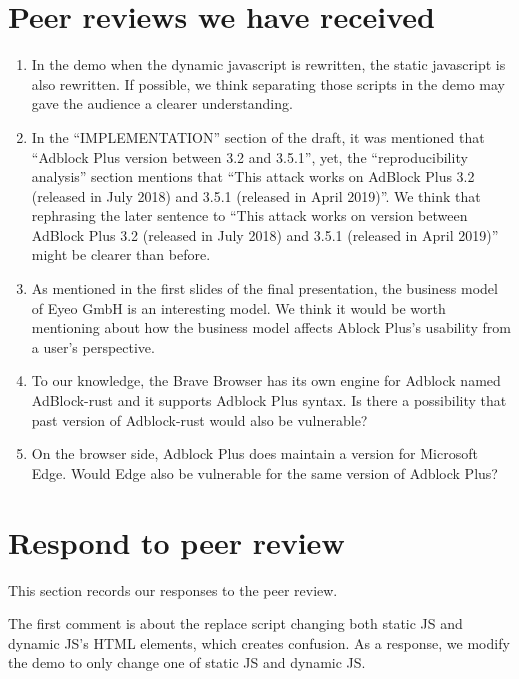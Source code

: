 \documentclass[conference]{IEEEtran}
\begin{document}
\begin{appendices}

\section{Peer reviews we have received}

\begin{enumerate}
    \item In the demo when the dynamic javascript is rewritten, the static javascript is also rewritten. If possible, we think separating those scripts in the demo may gave the audience a clearer understanding.
    \item In the ``IMPLEMENTATION'' section of the draft, it was mentioned that ``Adblock Plus version between 3.2 and 3.5.1'', yet, the ``reproducibility analysis'' section mentions that ``This attack works on AdBlock Plus 3.2 (released in July 2018) and 3.5.1 (released in April 2019)''. We think that rephrasing the later sentence to ``This attack works on version between AdBlock Plus 3.2 (released in July 2018) and 3.5.1 (released in April 2019)'' might be clearer than before.
    \item As mentioned in the first slides of the final presentation, the business model of Eyeo GmbH is an interesting model. We think it would be worth mentioning about how the business model affects Ablock Plus's usability from a user's perspective.
    \item To our knowledge, the Brave Browser has its own engine for Adblock named AdBlock-rust and it supports Adblock Plus syntax. Is there a possibility that past version of Adblock-rust would also be vulnerable?
    \item On the browser side, Adblock Plus does maintain a version for Microsoft Edge. Would Edge also be vulnerable for the same version of Adblock Plus?
\end{enumerate}

\section{Respond to peer review}

This section records our responses to the peer review.

The first comment is about the replace script changing both static JS and dynamic JS's HTML elements, which creates confusion. As a response, we modify the demo to only change one of static JS and dynamic JS.


\end{appendices}
\end{document}
